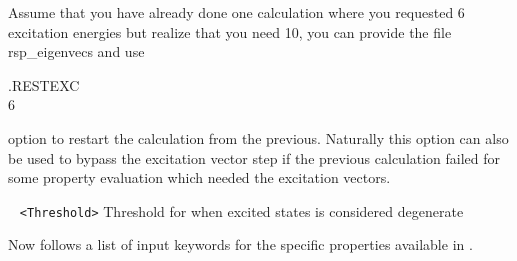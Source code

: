 \begin{description}
Assume that you have already done one calculation where you requested 6 excitation 
energies but realize that you need 10, you can provide the file rsp\_eigenvecs and use

.RESTEXC\\
6 

option to restart the calculation from the previous. 
Naturally this option can also be used to bypass the excitation vector step if the previous calculation failed for some property evaluation which needed the excitation vectors.  
\item[\Key{DTHR}] \verb| | \newline
\verb|<Threshold>|\newline 
Threshold for when excited states is considered degenerate
\end{description}
Now follows a list of input keywords for the specific properties
available in \lsdalton.

